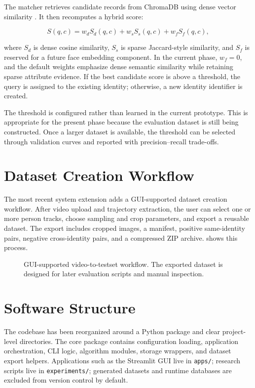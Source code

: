The matcher retrieves candidate records from ChromaDB using dense vector similarity \citep{chroma2024}. It then recomputes a hybrid score:

\begin{equation}
S(q, c) = w_d S_d(q, c) + w_s S_s(q, c) + w_f S_f(q, c),
\end{equation}

\noindent where $S_d$ is dense cosine similarity, $S_s$ is sparse Jaccard-style similarity, and $S_f$ is reserved for a future face embedding component. In the current phase, $w_f=0$, and the default weights emphasize dense semantic similarity while retaining sparse attribute evidence. If the best candidate score is above a threshold, the query is assigned to the existing identity; otherwise, a new identity identifier is created.

The threshold is configured rather than learned in the current prototype. This is appropriate for the present phase because the evaluation dataset is still being constructed. Once a larger dataset is available, the threshold can be selected through validation curves and reported with precision--recall trade-offs.

\section{Dataset Creation Workflow}

The most recent system extension adds a GUI-supported dataset creation workflow. After video upload and trajectory extraction, the user can select one or more person tracks, choose sampling and crop parameters, and export a reusable dataset. The export includes cropped images, a manifest, positive same-identity pairs, negative cross-identity pairs, and a compressed ZIP archive.  shows this process.

\begin{figure}[htbp]
  \centering
  
  \caption{GUI-supported video-to-testset workflow. The exported dataset is designed for later evaluation scripts and manual inspection.}
  \label{fig:dataset-pipeline}
\end{figure}

\section{Software Structure}

The codebase has been reorganized around a Python package and clear project-level directories. The core package contains configuration loading, application orchestration, CLI logic, algorithm modules, storage wrappers, and dataset export helpers. Applications such as the Streamlit GUI live in \texttt{apps/}; research scripts live in \texttt{experiments/}; generated datasets and runtime databases are excluded from version control by default.


